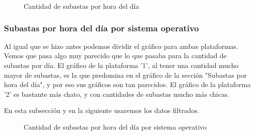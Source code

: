 \documentclass[a4paper, 12pt]{article}
\begin{document}
		\begin{figure}[H]
			\centering
		   	\caption{Cantidad de subastas por hora del día}
			\label{subastashora}
		\end{figure}


	\subsubsection{Subastas por hora del día por sistema operativo}
	 Al igual que se hizo antes podemos dividir el gráfico para ambas plataformas. Vemos que pasa algo muy parecido que lo que pasaba para la cantidad de subastas por día. El gráfico de la plataforma '1', al tener una cantidad mucho mayor de subastas, es la que predomina en el gráfico de la sección "Subastas por hora del día", y por eso sus gráficos son tan parecidos. El gráfico de la plataforma '2' es bastante más chato, y con cantidades de subastas mucho más chicas.
	 
	
	En esta subsección y en la siguiente usaremos los datos filtrados.

		\begin{figure}[H]
			\centering
		   	\caption{Cantidad de subastas por hora del día por sistema operativo}
			\label{subastashoraSO}
		\end{figure}
\end{document}
